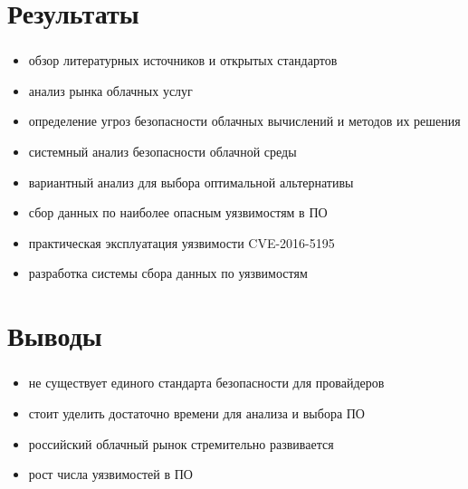 
\section{Результаты}

\begin{frame}
\frametitle{\insertsection}

\begin{itemize}
    \item обзор литературных источников и открытых стандартов
    \item анализ рынка облачных услуг
    \item определение угроз безопасности облачных вычислений и методов их решения
    \item системный анализ безопасности облачной среды
    \item вариантный анализ для выбора оптимальной альтернативы
    \item сбор данных по наиболее опасным уязвимостям в ПО
    \item практическая эксплуатация уязвимости CVE-2016-5195
    \item разработка системы сбора данных по уязвимостям
\end{itemize}
\end{frame}


\section{Выводы}

\begin{frame}
\frametitle{\insertsection}

\begin{itemize}
    \item не существует единого стандарта безопасности для провайдеров
    \item стоит уделить достаточно времени для анализа и выбора ПО
    \item российский облачный рынок стремительно развивается
    \item рост числа уязвимостей в ПО
\end{itemize}
\end{frame}


\frame[plain]{\titlepage}

